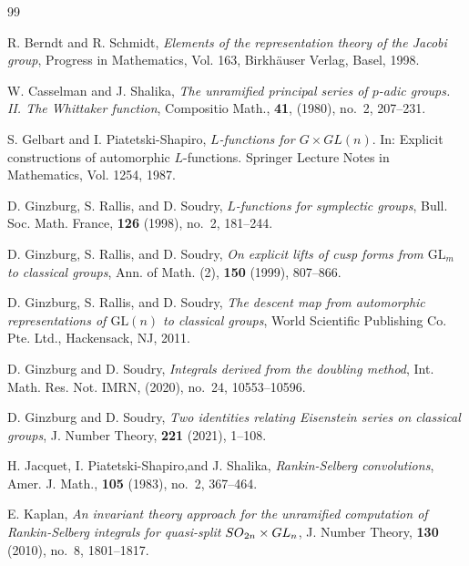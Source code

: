 \documentclass[11pt]{amsart}
\theoremstyle{definition}
\theoremstyle{remark}
\begin{document}
\begin{thebibliography}{99} 

R. Berndt and R. Schmidt, \textit{Elements of the representation theory of the {J}acobi group},  Progress in Mathematics, Vol. 163, Birkh\"{a}user Verlag, Basel, 1998.

W. Casselman and J. Shalika,
\textit{The unramified principal series of {$p$}-adic groups. {II}. {T}he {W}hittaker function},
   Compositio Math., \textbf{41},
   (1980), no.~2, 207--231. 

S. Gelbart and I. Piatetski-Shapiro,
\textit{{$L$}-functions for {$G\times GL(n)$}}. In: Explicit constructions of automorphic {$L$}-functions. Springer Lecture Notes in Mathematics, Vol. 1254, 1987.

D. Ginzburg, S. Rallis, and D. Soudry, \textit{$L$-functions for symplectic groups}, Bull. Soc. Math. France, \textbf{126} (1998), no.~2, 181--244. 

D. Ginzburg, S. Rallis, and D. Soudry, \textit{On explicit lifts of cusp forms from $\mathrm{GL}_m$ to classical groups}, Ann. of Math. (2), \textbf{150} (1999), 807--866.

D. Ginzburg, S. Rallis, and D. Soudry, \textit{The descent map from automorphic representations of {${\mathrm{GL}}(n)$} to classical groups}, World Scientific Publishing Co. Pte. Ltd., Hackensack, NJ, 2011.

D. Ginzburg and D. Soudry, \textit{Integrals derived from the doubling method}, Int. Math. Res. Not. IMRN, (2020), no.~24, 10553--10596. 

D. Ginzburg and D. Soudry, \textit{Two identities relating Eisenstein series on classical groups}, J. Number Theory, \textbf{221} (2021), 1--108. 

H. Jacquet, I.  Piatetski-Shapiro,and J. Shalika, \textit{Rankin-{S}elberg convolutions},  Amer. J. Math., \textbf{105} (1983), no.~2, 367--464. 


E. Kaplan,
\textit{An invariant theory approach for the unramified computation of {R}ankin-{S}elberg integrals for quasi-split {${\rm
              SO}_{2n}\times {\rm GL}_n$}}, J. Number Theory, \textbf{130} (2010), no.~8, 1801--1817. 



\end{thebibliography}
\end{document}
